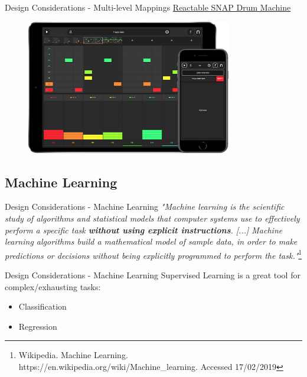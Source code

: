 \documentclass{beamer}
\begin{document}
\begin{frame}{Design Considerations - Multi-level Mappings}
    \href{https://www.youtube.com/watch?v=0YAOyjPwoJ8}{Reactable SNAP Drum Machine}
    \begin{figure}[h]
        \includegraphics[width=0.8\textwidth]{snap.png}
    \end{figure}
\end{frame}

\subsection{Machine Learning}

\begin{frame}{Design Considerations - Machine Learning}
    \textit{"Machine learning is the scientific study of algorithms and statistical models that computer systems use to effectively perform a specific task \textbf{without using explicit instructions}. [...] Machine learning algorithms build a mathematical model of sample data, in order to make predictions or decisions without being explicitly programmed to perform the task."}\footnote{Wikipedia. Machine Learning. https://en.wikipedia.org/wiki/Machine\_learning. Accessed 17/02/2019}
\end{frame}

\begin{frame}{Design Considerations - Machine Learning}
    Supervised Learning is a great tool for complex/exhausting tasks:
    \begin{itemize}
        \item Classification
        \item Regression
    \end{itemize}
\end{frame}
\end{document}
